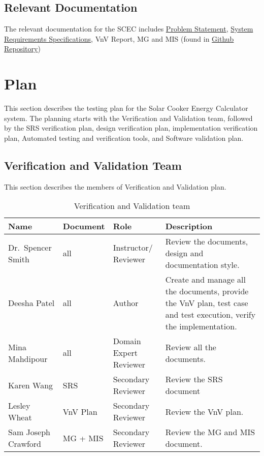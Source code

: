 \documentclass[12pt, titlepage]{article}
\begin{document}
\subsection{Relevant Documentation}

The relevant documentation for the SCEC includes \href{https://github.com/DeeshaPatel/CAS-741-Solar-Cooker/blob/7c53c8d9a19ca2f94dfba6ba9208eae0bf03b8cc/docs/ProblemStatementAndGoals/ProblemStatement.pdf}{Problem Statement}, \href{https://github.com/DeeshaPatel/CAS-741-Solar-Cooker/blob/7c53c8d9a19ca2f94dfba6ba9208eae0bf03b8cc/docs/SRS/SRS.pdf}{System Requirements Specifications}, VnV Report, MG and MIS (found in \href{https://github.com/DeeshaPatel/CAS-741-Solar-Cooker/tree/main/docs}{Github Repository})  


\section{Plan}
\label{plan}

This section describes the testing plan for the Solar Cooker Energy Calculator system. The planning starts with the Verification and Validation team, followed by the SRS verification plan, design verification plan, implementation verification plan, Automated testing and verification tools, and Software validation plan.  

\subsection{Verification and Validation Team}

This section describes the members of Verification and Validation plan. 

\begin{center}
\begin{table}[h!]
\begin{tabular}{ |l|l|p{2cm}|p{5cm}| } 
\hline
\rowcolor[gray]{0.9}
\textbf{Name} & \textbf{Document} & \textbf{Role} & \textbf{Description} \\
\hline
 Dr.\ Spencer Smith & all & Instructor/ Reviewer & Review the documents, design and documentation style. \\ 
 \hline
 Deesha Patel & all & Author & Create and manage all the documents, provide the VnV plan, test case and test execution, verify the implementation. \\  
 \hline
 Mina Mahdipour & all & Domain Expert Reviewer & Review all the documents. \\  
 \hline
 Karen Wang & SRS & Secondary Reviewer & Review the SRS document \\
 \hline
Lesley  Wheat & VnV Plan & Secondary Reviewer & Review the VnV plan. \\ 
\hline 
Sam Joseph Crawford & MG + MIS & Secondary Reviewer & Review the MG and MIS document. \\
\hline 

\hline
\end{tabular}
\caption{Verification and Validation team} 
\label{verification_validation}
\end{table}
\end{center}
\end{document}
